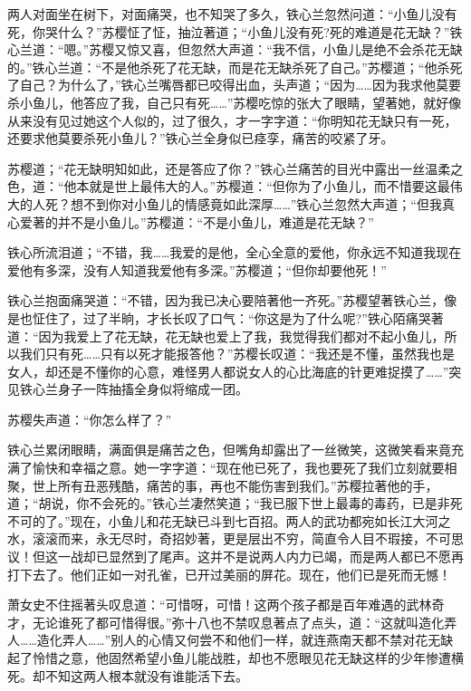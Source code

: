 \documentclass[12pt,oneside]{book}
\begin{document}
两人对面坐在树下，对面痛哭，也不知哭了多久，铁心兰忽然问道：``小鱼儿没有死，你哭什么？''苏樱怔了怔，抽泣著道；``小鱼儿没有死?死的难道是花无缺？''铁心兰道：``嗯。''苏樱又惊又喜，但忽然大声道：``我不信，小鱼儿是绝不会杀花无缺的。''铁心兰道：``不是他杀死了花无缺，而是花无缺杀死了自己。''苏樱道；``他杀死了自己？为什么了，''铁心兰嘴唇都已咬得出血，头声道；``因为\ldots\ldots 因为我求他莫要杀小鱼儿，他答应了我，自己只有死\ldots\ldots{}''苏樱吃惊的张大了眼睛，望著她，就好像从来没有见过她这个人似的，过了很久，才一字字道：``你明知花无缺只有一死，还要求他莫要杀死小鱼儿？''铁心兰全身似已痉孪，痛苦的咬紧了牙。

苏樱道；``花无缺明知如此，还是答应了你？''铁心兰痛苦的目光中露出一丝温柔之色，道：``他本就是世上最伟大的人。''苏樱道：``但你为了小鱼儿，而不惜要这最伟大的人死？想不到你对小鱼儿的情感竟如此深厚\ldots\ldots{}''铁心兰忽然大声道；``但我真心爱著的并不是小鱼儿。''苏樱道：``不是小鱼儿，难道是花无缺？''

铁心所流泪道；``不错，我\ldots\ldots 我爱的是他，全心全意的爱他，你永远不知道我现在爱他有多深，没有人知道我爱他有多深。''苏樱道；``但你却要他死！''

铁心兰抱面痛哭道：``不错，因为我已决心要陪著他一齐死。''苏樱望著铁心兰，像是也怔住了，过了半晌，才长长叹了口气：``你这是为了什么呢?''铁心陌痛哭著道：``因为我爱上了花无缺，花无缺也爱上了我，我觉得我们都对不起小鱼儿，所以我们只有死\ldots\ldots 只有以死才能报答他？''苏樱长叹道：``我还是不懂，虽然我也是女人，却还是不懂你的心意，难怪男人都说女人的心比海底的针更难捉摸了\ldots\ldots{}''突见铁心兰身子一阵抽搐全身似将缩成一团。

苏樱失声道：``你怎么样了？''

铁心兰累闭眼睛，满面俱是痛苦之色，但嘴角却露出了一丝微笑，这微笑看来竟充满了愉快和幸福之意。她一字字道：``现在他已死了，我也要死了我们立刻就要相聚，世上所有丑恶残酷，痛苦的事，再也不能伤害到我们。''苏樱拉著他的手，道；``胡说，你不会死的。''铁心兰凄然笑道；``我已服下世上最毒的毒药，已是非死不可的了。''现在，小鱼儿和花无缺已斗到七百招。两人的武功都宛如长江大河之水，滚滚而来，永无尽时，奇招妙著，更是层出不穷，简直令人目不瑕接，不可思议！但这一战却已显然到了尾声。这并不是说两人内力已竭，而是两人都已不愿再打下去了。他们正如一对孔雀，已开过美丽的屏花。现在，他们已是死而无憾！

萧女史不住摇著头叹息道：``可惜呀，可惜！这两个孩子都是百年难遇的武林奇才，无论谁死了都可惜得很。''弥十八也不禁叹息著点了点头，道：``这就叫造化弄人\ldots\ldots 造化弄人\ldots\ldots{}''别人的心情又何尝不和他们一样，就连燕南天都不禁对花无缺起了怜惜之意，他固然希望小鱼儿能战胜，却也不愿眼见花无缺这样的少年惨遭横死。却不知这两人根本就没有谁能活下去。
\end{document}

